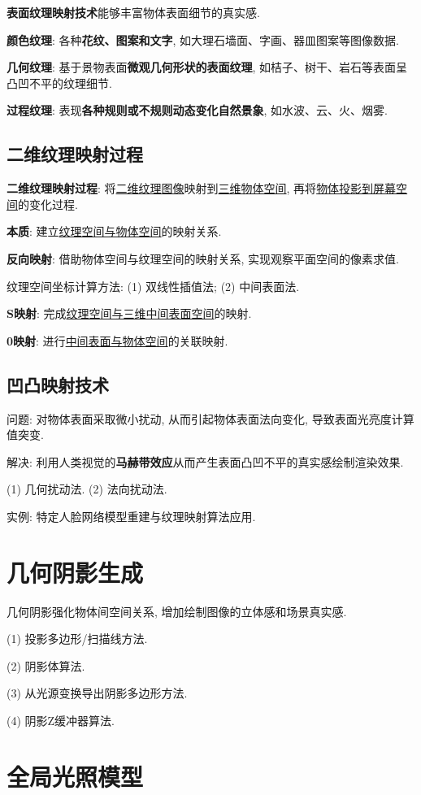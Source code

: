 \documentclass[12pt, a4paper, oneside]{ctexart}
\def\ul{\underline}         %
\def\bf{\textbf}            %
\begin{document}
\bf{表面纹理映射技术}能够丰富物体表面细节的真实感.

\bf{颜色纹理}: 各种\bf{花纹、图案和文字}, 如大理石墙面、字画、器皿图案等图像数据.

\bf{几何纹理}: 基于景物表面\bf{微观几何形状的表面纹理}, 如桔子、树干、岩石等表面呈凸凹不平的纹理细节.

\bf{过程纹理}: 表现\bf{各种规则或不规则动态变化自然景象}, 如水波、云、火、烟雾.

\subsection{二维纹理映射过程}

\bf{二维纹理映射过程}: 将\ul{二维纹理图像}映射到\ul{三维物体空间}, 再将\ul{物体投影到屏幕空间}的变化过程.

\bf{本质}: 建立\ul{纹理空间与物体空间}的映射关系.

\bf{反向映射}: 借助物体空间与纹理空间的映射关系, 实现观察平面空间的像素求值.

纹理空间坐标计算方法: (1) 双线性插值法; (2) 中间表面法.

\bf{S映射}: 完成\ul{纹理空间与三维中间表面空间}的映射.

\bf{0映射}: 进行\ul{中间表面与物体空间}的关联映射.

\subsection{凹凸映射技术}

问题: 对物体表面采取微小扰动, 从而引起物体表面法向变化, 导致表面光亮度计算值突变.

解决: 利用人类视觉的\bf{马赫带效应}从而产生表面凸凹不平的真实感绘制渲染效果.

(1) 几何扰动法. (2) 法向扰动法.

实例: 特定人脸网络模型重建与纹理映射算法应用.

\section{几何阴影生成}

几何阴影强化物体间空间关系, 增加绘制图像的立体感和场景真实感.

(1) 投影多边形/扫描线方法.

(2) 阴影体算法.

(3) 从光源变换导出阴影多边形方法.

(4) 阴影Z缓冲器算法.

\section{全局光照模型}
\end{document}
